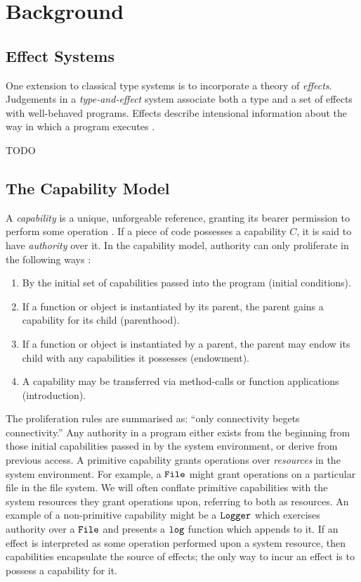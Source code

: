 
\section{Background}

\subsection{Effect Systems}

One extension to classical type systems is to incorporate a theory of \textit{effects}. Judgements in a \textit{type-and-effect} system associate both a type and a set of effects with well-behaved programs. Effects describe intensional information about the way in which a program executes \cite{nielson99}.

TODO


\subsection{The Capability Model}

A \textit{capability} is a unique, unforgeable reference, granting its bearer permission to perform some operation \cite{dennis66}. If a piece of code possesses a capability $C$, it is said to have \textit{authority} over it. In the capability model, authority can only proliferate in the following ways \cite{miller06}:

\begin{enumerate}
	\item By the initial set of capabilities passed into the program (initial conditions).
	\item If a function or object is instantiated by its parent, the parent gains a capability for its child (parenthood).
	\item If a function or object is instantiated by a parent, the parent may endow its child with any capabilities it possesses (endowment).
	\item A capability may be transferred via method-calls or function applications (introduction).
\end{enumerate}

The proliferation rules are summarised as: ``only connectivity begets connectivity.'' Any authority in a program either exists from the beginning from those initial capabilities passed in by the system environment, or derive from previous access. A primitive capability grants operations over \textit{resources} in the system environment. For example, a $\mathtt{File}$ might grant operations on a particular file in the file system. We will often conflate primitive capabilities with the system resources they grant operations upon, referring to both as resources. An example of a non-primitive capability might be a $\mathtt{Logger}$ which exercises authority over a $\mathtt{File}$ and presents a $\mathtt{log}$ function which appends to it. If an effect is interpreted as some operation performed upon a system resource, then capabilities encapsulate the source of effects; the only way to incur an effect is to possess a capability for it.

